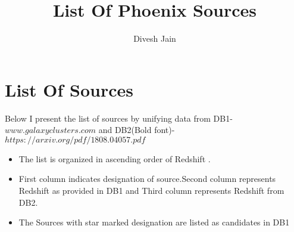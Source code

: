 \documentclass[10pt]{article}
\begin{document}
\title{List Of Phoenix Sources}
\author{Divesh Jain}
\maketitle
\newpage
\section{List Of Sources}
Below I present the list of sources by unifying data from DB1-$www.galaxyclusters.com$ and DB2(Bold font)-$https://arxiv.org/pdf/1808.04057.pdf
$
\begin{itemize}
\item The list is organized in ascending order of Redshift .\\
\item First column indicates designation of source.Second column represents Redshift as provided in DB1  and Third column represents Redshift from DB2.
\item The Sources with star marked designation are listed as candidates in DB1
\end{itemize}
\end{document}
